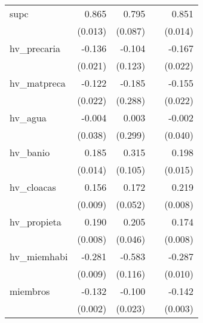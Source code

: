 {\begin{longtable}{l*{4}{D{.}{.}{-1}}}
\addlinespace
supc        &       0.865\sym{***}&       0.795\sym{***}&                     &       0.851\sym{***}\\
            &     (0.013)         &     (0.087)         &                     &     (0.014)         \\
\addlinespace
hv\_precaria &      -0.136\sym{***}&      -0.104         &                     &      -0.167\sym{***}\\
            &     (0.021)         &     (0.123)         &                     &     (0.022)         \\
\addlinespace
hv\_matpreca &      -0.122\sym{***}&      -0.185         &                     &      -0.155\sym{***}\\
            &     (0.022)         &     (0.288)         &                     &     (0.022)         \\
\addlinespace
hv\_agua     &      -0.004         &       0.003         &                     &      -0.002         \\
            &     (0.038)         &     (0.299)         &                     &     (0.040)         \\
\addlinespace
hv\_banio    &       0.185\sym{***}&       0.315\sym{**} &                     &       0.198\sym{***}\\
            &     (0.014)         &     (0.105)         &                     &     (0.015)         \\
\addlinespace
hv\_cloacas  &       0.156\sym{***}&       0.172\sym{**} &                     &       0.219\sym{***}\\
            &     (0.009)         &     (0.052)         &                     &     (0.008)         \\
\addlinespace
hv\_propieta &       0.190\sym{***}&       0.205\sym{***}&                     &       0.174\sym{***}\\
            &     (0.008)         &     (0.046)         &                     &     (0.008)         \\
\addlinespace
hv\_miemhabi &      -0.281\sym{***}&      -0.583\sym{***}&                     &      -0.287\sym{***}\\
            &     (0.009)         &     (0.116)         &                     &     (0.010)         \\
\addlinespace
miembros    &      -0.132\sym{***}&      -0.100\sym{***}&                     &      -0.142\sym{***}\\
            &     (0.002)         &     (0.023)         &                     &     (0.003)         \\

\end{longtable}}
